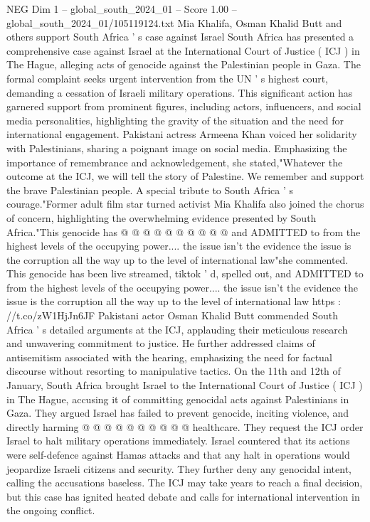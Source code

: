 \begin{textsample}{NEG Dim 1 – global\_south\_2024\_01 – Score 1.00 – global\_south\_2024\_01/105119124.txt}  \label{ex:f1_neg_332}
Mia Khalifa, Osman Khalid Butt and others support South Africa ' s case against Israel South Africa has presented a comprehensive case against Israel at the International Court of Justice ( ICJ ) in The Hague, alleging acts of genocide against the Palestinian people in Gaza.
The formal complaint seeks urgent intervention from the UN ' s highest court, demanding a cessation of Israeli military operations.
This significant action has garnered support from prominent figures, including actors, influencers, and social media personalities, highlighting the gravity of the situation and the need for international engagement.
Pakistani actress Armeena Khan voiced her solidarity with Palestinians, sharing a poignant image on social media.
Emphasizing the importance of remembrance and acknowledgement, she stated,"Whatever the outcome at the ICJ, we will tell the story of Palestine.
We remember and support the brave Palestinian people.
A special tribute to South Africa ' s courage."Former adult film star turned activist Mia Khalifa also joined the chorus of concern, highlighting the overwhelming evidence presented by South Africa."This genocide has @ @ @ @ @ @ @ @ @ @ and ADMITTED to from the highest levels of the occupying power.... the issue isn't the evidence the issue is the corruption all the way up to the level of international law"she commented.
This genocide has been live streamed, tiktok ' d, spelled out, and ADMITTED to from the highest levels of the occupying power.... the issue isn't the evidence the issue is the corruption all the way up to the level of international law https : //t.co/zW1HjJn6JF Pakistani actor Osman Khalid Butt commended South Africa ' s detailed arguments at the ICJ, applauding their meticulous research and unwavering commitment to justice.
He further addressed claims of antisemitism associated with the hearing, emphasizing the need for factual discourse without resorting to manipulative tactics.
On the 11th and 12th of January, South Africa brought Israel to the International Court of Justice ( ICJ ) in The Hague, accusing it of committing genocidal acts against Palestinians in Gaza.
They argued Israel has failed to prevent genocide, inciting violence, and directly harming @ @ @ @ @ @ @ @ @ @ healthcare.
They request the ICJ order Israel to halt military operations immediately.
Israel countered that its actions were self-defence against Hamas attacks and that any halt in operations would jeopardize Israeli citizens and security.
They further deny any genocidal intent, calling the accusations baseless.
The ICJ may take years to reach a final decision, but this case has ignited heated debate and calls for international intervention in the ongoing conflict.

\end{textsample}
